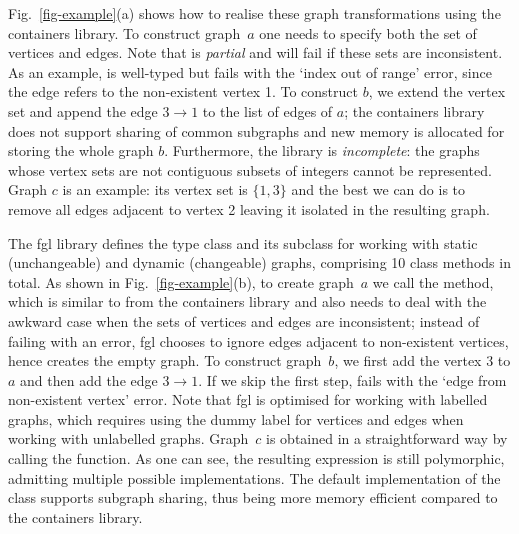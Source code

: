 Fig.~\ref{fig-example}(a) shows how to realise these graph transformations
using the \textsf{containers} library. To construct graph~$a$ one needs
to specify both the set of vertices and edges. Note that
 is \emph{partial} and will fail if these sets are inconsistent.
As an example,  is well-typed but fails with the
\textsf{`index out of range'} error, since the edge refers to the non-existent vertex 1.
To construct $b$, we extend the vertex set and append the
edge $3 \rightarrow 1$ to the list of edges of $a$; the \textsf{containers} library does
not support sharing of common subgraphs and new memory is allocated for
storing the whole graph $b$. Furthermore, the library is
\emph{incomplete}: the graphs whose vertex sets are not contiguous subsets of
integers cannot be represented. Graph $c$ is an example: its vertex set is
$\{1,3\}$ and the best we can do is to remove all edges adjacent to vertex 2
leaving it isolated in the resulting graph.

The \textsf{fgl} library defines the type class  and its subclass
 for working with static (unchangeable) and dynamic (changeable)
graphs, comprising 10 class methods in total. As shown in Fig.~\ref{fig-example}(b),
to create graph~$a$ we call the  method, which is similar to
 from the \textsf{containers} library and also needs to deal with the
awkward case when the sets of vertices and edges are inconsistent; instead of
failing with an error, \textsf{fgl} chooses to ignore edges adjacent to non-existent
vertices, hence \hs{mkUGraph [}\hs{] [(1,2)]} creates the empty graph. To construct
graph~$b$, we first add the vertex 3 to $a$ and then add the edge $3 \rightarrow 1$.
If we skip the first step,  fails with the
\textsf{`edge from non-existent vertex'} error.
Note that \textsf{fgl} is optimised for working with labelled graphs, which requires
using the dummy label \hs{()} for vertices and edges when working with unlabelled
graphs. Graph~$c$ is obtained in a straightforward way by calling the 
function. As one can see, the resulting expression is still polymorphic, admitting
multiple possible implementations. The default implementation of the 
class supports subgraph sharing, thus being more memory efficient compared to
the \textsf{containers} library.

